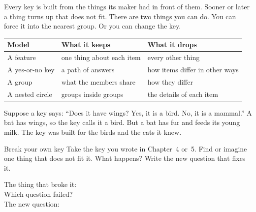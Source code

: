 \label{ch6}

Every key is built from the things its maker had in front of them. Sooner or later a thing turns up that does not fit. There are two things you can do. You can force it into the nearest group. Or you can change the key.

\begin{center}
\sffamily\small\renewcommand{\arraystretch}{1.5}
\begin{tabular}{@{}p{3.4cm}p{3.7cm}p{3.7cm}@{}}
\toprule
\textbf{Model} & \textbf{What it keeps} & \textbf{What it drops}\\
\midrule
A feature & one thing about each item & every other thing\\
A yes-or-no key & a path of answers & how items differ in other ways\\
A group & what the members share & how they differ\\
A nested circle & groups inside groups & the details of each item\\
\bottomrule
\end{tabular}
\end{center}

Suppose a key says: ``Does it have wings? Yes, it is a bird. No, it is a mammal.'' A bat has wings, so the key calls it a bird. But a bat has fur and feeds its young milk. The key was built for the birds and the cats it knew.

\begin{center}
\end{center}

\begin{tryit}{Break your own key}
Take the key you wrote in Chapter~4 or~5. Find or imagine one thing that does not fit it. What happens? Write the new question that fixes it.\par\medskip
The thing that broke it: \wline[6cm]\\[8pt]
Which question failed? \wline[6cm]\\[8pt]
The new question: \wline[6cm]
\end{tryit}

